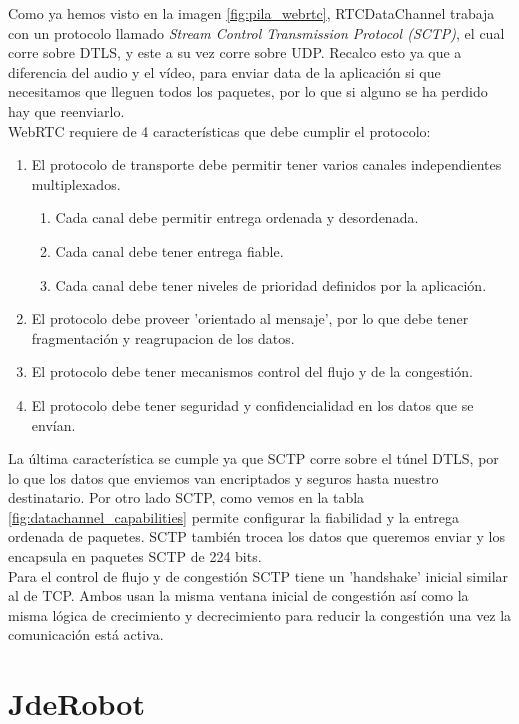 Como ya hemos visto en la imagen \ref{fig:pila_webrtc}, RTCDataChannel trabaja con un protocolo llamado \textit{Stream Control Transmission Protocol (SCTP)}, el cual corre sobre DTLS, y este a su vez corre sobre UDP. Recalco esto ya que a diferencia del audio y el vídeo, para enviar data de la aplicación si que necesitamos que lleguen todos los paquetes, por lo que si alguno se ha perdido hay que reenviarlo.\\

\noindent WebRTC requiere de 4 características que debe cumplir el protocolo:

\begin{enumerate}
\item El protocolo de transporte debe permitir tener varios canales independientes multiplexados.
\begin{enumerate}
\item Cada canal debe permitir entrega ordenada y desordenada.
\item Cada canal debe tener entrega fiable.
\item Cada canal debe tener niveles de prioridad definidos por la aplicación.
\end{enumerate}
\item El protocolo debe proveer 'orientado al mensaje', por lo que debe tener fragmentación y reagrupacion de los datos.
\item El protocolo debe tener mecanismos control del flujo y de la congestión.
\item El protocolo debe tener seguridad y confidencialidad en los datos que se envían.
\end{enumerate}

La última característica se cumple ya que SCTP corre sobre el túnel DTLS, por lo que los datos que enviemos van encriptados y seguros hasta nuestro destinatario. Por otro lado SCTP, como vemos en la tabla \ref{fig:datachannel_capabilities} permite configurar la fiabilidad y la entrega ordenada de paquetes. SCTP también trocea los datos que queremos enviar y los encapsula en paquetes SCTP de 224 bits.\\

Para el control de flujo y de congestión SCTP tiene un 'handshake' inicial similar al de TCP. Ambos usan la misma ventana inicial de congestión así como la misma lógica de crecimiento y decrecimiento para reducir la congestión una vez la comunicación está activa.\\


\section{JdeRobot}


